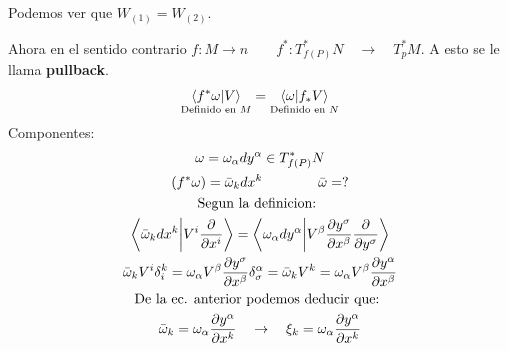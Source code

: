 \documentclass{article}
\begin{document}
Podemos ver que $ W _{(1) } = W _{(2) }  $.

Ahora en el sentido contrario $ f: M \rightarrow n  \qquad f ^* : T^* _{f(P)} N \quad \rightarrow \quad T^*_p M   $. A esto se le llama \textbf{pullback}.
\begin{gather*}
  \underset{\text{Definido en }M }{\bra{f^* \omega }\ket{V } } = \underset{\text{Definido en }N }{\bra{\omega}\ket{f_* V } } 
\end{gather*}
Componentes: 
\begin{gather*}
  \omega = \omega _{\alpha }  dy ^ {\alpha } \in  T^* _{f(P)} N\\
  (f^* \omega ) = \bar \omega _k dx ^ {k } \qquad \qquad \bar \omega =? \\
  \text{Segun la definicion: }\\
  \bra{\bar \omega_k dx ^ {k} }\ket{V ^ {i } \frac{\partial  }{\partial x ^ {i }}} = \bra{\omega_\alpha dy ^ {\alpha}}\ket{V ^ {\beta} \frac{\partial y ^ {\sigma } }{\partial x ^ {\beta}} \frac{\partial  }{\partial y ^ {\sigma}}}  \\
  \bar \omega _k V^i \delta _i^k = \omega _\alpha V ^\beta \frac{\partial y ^ {\sigma} }{\partial x ^ {\beta}} \delta_\sigma^\alpha = \bar \omega_k V^k = \omega_\alpha V^\beta \frac{\partial y ^\alpha }{\partial x ^\beta }\\
  \text{De la ec. anterior podemos deducir que: }\\
  \bar \omega_k = \omega_\alpha \frac{\partial y ^ {\alpha } }{\partial x ^ {k }} \quad \rightarrow \quad \xi_k = \omega_\alpha \frac{\partial y ^ {\alpha } }{\partial x ^ {k }}
\end{gather*}
\end{document}
